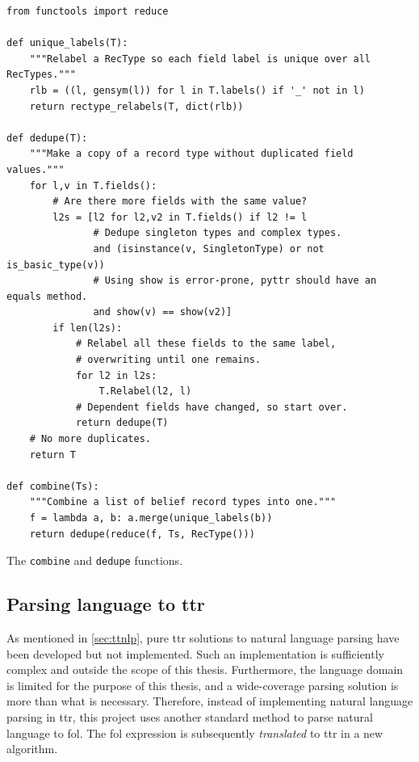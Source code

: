 \begin{listing}
\begin{lstlisting}[label={lst:combine}]
from functools import reduce

def unique_labels(T):
    """Relabel a RecType so each field label is unique over all RecTypes."""
    rlb = ((l, gensym(l)) for l in T.labels() if '_' not in l)
    return rectype_relabels(T, dict(rlb))

def dedupe(T):
    """Make a copy of a record type without duplicated field values."""
    for l,v in T.fields():
        # Are there more fields with the same value?
        l2s = [l2 for l2,v2 in T.fields() if l2 != l
               # Dedupe singleton types and complex types.
               and (isinstance(v, SingletonType) or not is_basic_type(v))
               # Using show is error-prone, pyttr should have an equals method.
               and show(v) == show(v2)]
        if len(l2s):
            # Relabel all these fields to the same label,
			# overwriting until one remains.
            for l2 in l2s:
                T.Relabel(l2, l)
            # Dependent fields have changed, so start over.
            return dedupe(T)
    # No more duplicates.
    return T

def combine(Ts):
    """Combine a list of belief record types into one."""
    f = lambda a, b: a.merge(unique_labels(b))
    return dedupe(reduce(f, Ts, RecType()))
\end{lstlisting}
\caption{The \texttt{combine} and \texttt{dedupe} functions.}
\end{listing}



\subsection{Parsing language to \gls{ttr}}
\label{sec:parsing}

As mentioned in \autoref{sec:ttnlp}, pure \gls{ttr} solutions to natural language parsing have been developed but not implemented.
Such an implementation is sufficiently complex and outside the scope of this thesis.
Furthermore, the language domain is limited for the purpose of this thesis, and a wide-coverage parsing solution is more than what is necessary.
Therefore, instead of implementing natural language parsing in \gls{ttr}, this project uses
another standard method to parse natural language to \gls{fol}.
The \gls{fol} expression is subsequently \textit{translated} to \gls{ttr} in a new algorithm.

